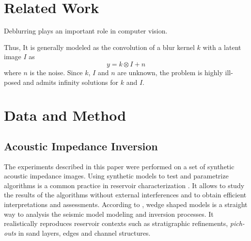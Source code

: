 \documentclass[conference,compsoc]{IEEEtran}
\begin{document}

\section{Related Work}
Deblurring plays an important role in computer vision.

Thus, It is generally modeled as the convolution of a blur kernel $k$
with a latent image $I$ as
\begin{equation}
 y = k \otimes I + n
 \label{eq:fourier}
\end{equation}
where $n$ is the noise. Since $k$, $I$ and $n$ are unknown, the problem 
is highly ill-posed and admits infinity solutions for $k$ and $I$.





\section{Data and Method}

\subsection{Acoustic Impedance Inversion}
The experiments described in this paper were performed
on a set of synthetic acoustic impedance images. Using synthetic models
to test and parametrize algorithms is a common practice in reservoir characterization \cite{sergio}. It allows to study the
results of the algorithms without external interferences and to obtain efficient interpretations and assessments. 
According to \cite{Harvey}, wedge shaped models is a straight way to analysis the
seismic model modeling and inversion processes. It realistically reproduces
reservoir contexts such as stratigraphic refinements, \textit{pich-outs} in sand layers, 
edges and channel structures.
\end{document}
